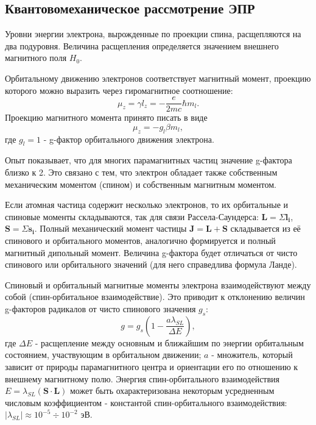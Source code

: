 \documentclass[a4paper,14pt]{article}
\begin{document}
\subsection{Квантовомеханическое рассмотрение ЭПР}
Уровни энергии электрона, вырожденные по проекции спина, расщепляются на два подуровня. Величина расщепления определяется значением внешнего магнитного поля $ H_0 $. 
\par 
Орбитальному движению электронов соответствует магнитный момент, проекцию которого можно выразить через гиромагнитное соотношение:
\begin{equation}
	\mu_z=\gamma l_z = -\frac{e}{2mc}\hbar m_l.
\end{equation}
Проекцию магнитного момента принято писать в виде
\begin{equation}
	\mu_z = -g_l \beta m_l,
\end{equation}
где $ g_l = 1$ - g-фактор орбитального движения электрона.  
\par 
Опыт показывает, что для многих парамагнитных частиц значение g-фактора близко к 2. Это связано с тем, что электрон обладает также собственным механическим моментом (спином) и собственным магнитным моментом.
\par 
Если атомная частица содержит несколько электронов, то их орбитальные и спиновые моменты складываются, так для связи Рассела-Саундерса: $ \mathbf{L}=\Sigma \mathbf{l_i} $, $ \mathbf{S}=\Sigma \mathbf{s_i} $. Полный механический момент частицы $ \mathbf{J=L+S} $ складывается из её спинового и орбитального моментов, аналогично формируется и полный магнитный дипольный момент. Величина g-фактора будет отличаться от чисто спинового или орбитального значений (для него справедлива формула Ланде). 
\par 
Спиновый и орбитальный магнитные моменты электрона взаимодействуют между собой (спин-орбитальное взаимодействие). Это приводит к отклонению величин g-факторов радикалов от чисто спинового значения $ g_s $:
\begin{equation}
	g=g_s \left(1-\frac{a \lambda_{SL}}{\Delta E}\right),
\end{equation}
где $ \Delta E $ - расщепление между основным и ближайшим по энергии орбитальным состоянием, участвующим в орбитальном движении; $ a $ - множитель, который зависит от природы парамагнитного центра и ориентации его по отношению к внешнему магнитному полю. Энергия спин-орбитального взаимодействия $ E=\lambda_{SL}(\mathbf{S \cdot L}) $ может быть охарактеризована некоторым усредненным числовым коэффициентом - константой спин-орбитального взаимодействия: $ |\lambda_{SL}| \approx 10^{-5} \div 10^{-2}$ эВ. 
\end{document}
